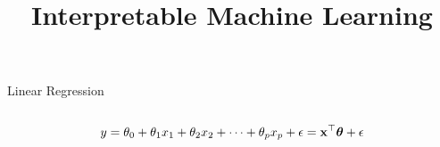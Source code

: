 \documentclass[11pt,compress,t,notes=noshow, aspectratio=169, xcolor=table]{beamer}
\title{Interpretable Machine Learning}
\date{}
\begin{document}
\newcommand{\titlefigure}{figure/lm_example}
\newcommand{\learninggoals}{
\item LM basics and assumptions
\item Interpretation of main effects in LM
\item What are significant features?
}





\begin{frame}[c]{Linear Regression}

\begin{columns}[T, totalwidth = \linewidth]
\begin{column}{0.58\linewidth}
$$y = \theta_0 + \theta_1 x_1 + \theta_2 x_2 + \dots + \theta_p x_p + \epsilon = \mathbf{x}^\top \bm{\theta} + \epsilon$$


\end{column}
\end{columns}
\end{frame}
\end{document}
